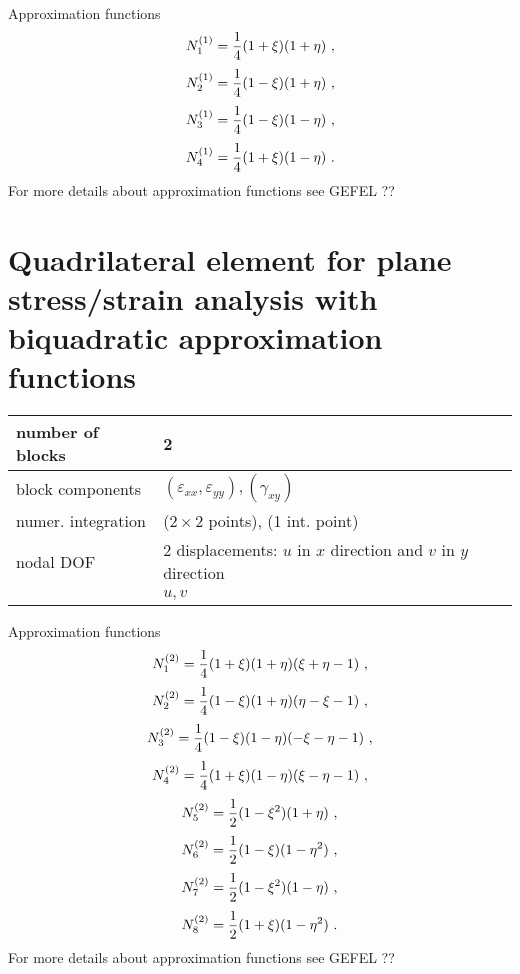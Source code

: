 Approximation functions
\begin{equation}
N_1^{(1)} = \mbox{$\displaystyle\frac{1}{4}$}(1+\xi)(1+\eta)\ ,
\end{equation}
\begin{equation}
N_2^{(1)} = \mbox{$\displaystyle\frac{1}{4}$}(1-\xi)(1+\eta)\ ,
\end{equation}
\begin{equation}
N_3^{(1)} = \del{1}{4}(1-\xi)(1-\eta)\ ,
\end{equation}
\begin{equation}
N_4^{(1)} = \mbox{$\displaystyle\frac{1}{4}$}(1+\xi)(1-\eta)\ .
\end{equation}
For more details about approximation functions see GEFEL ??

\section{Quadrilateral element for plane stress/strain ana\-lysis with biquadratic approximation functions}
\label{sectrectelemquadfun}

\begin{tabular}{|l|l|}
\hline
number of blocks & 2
\\ \hline
block components & $(\varepsilon_{xx},\varepsilon_{yy}), (\gamma_{xy})$
\\ \hline
numer. integration & ($2 \times 2$ points), (1 int. point)
\\ \hline
nodal DOF & 2 displacements: $u$ in $x$ direction and $v$ in $y$ direction
\\ \cline{2-2}
 & $u,v$
\\ \hline
\end{tabular}

Approximation functions
\begin{equation}
N_1^{(2)} = \mbox{$\displaystyle\frac{1}{4}$}(1+\xi)(1+\eta)(\xi+\eta-1)\ ,
\end{equation}
\begin{equation}
N_2^{(2)} = \mbox{$\displaystyle\frac{1}{4}$}(1-\xi)(1+\eta)(\eta-\xi-1)\ ,
\end{equation}
\begin{equation}
N_3^{(2)} = \mbox{$\displaystyle\frac{1}{4}$}(1-\xi)(1-\eta)(-\xi-\eta-1)\ ,
\end{equation}
\begin{equation}
N_4^{(2)} = \mbox{$\displaystyle\frac{1}{4}$}(1+\xi)(1-\eta)(\xi-\eta-1)\ ,
\end{equation}
\begin{equation}
N_5^{(2)} = \del{1}{2}(1-\xi^2)(1+\eta)\ ,
\end{equation}
\begin{equation}
N_6^{(2)} = \mbox{$\displaystyle\frac{1}{2}$}(1-\xi)(1-\eta^2)\ ,
\end{equation}
\begin{equation}
N_7^{(2)} = \del{1}{2}(1-\xi^2)(1-\eta)\ ,
\end{equation}
\begin{equation}
N_8^{(2)} = \mbox{$\displaystyle\frac{1}{2}$}(1+\xi)(1-\eta^2)\ .
\end{equation}
For more details about approximation functions see GEFEL ??

